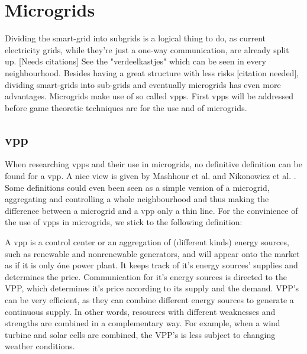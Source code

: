 \section{Microgrids }
Dividing the smart-grid into subgrids is a logical thing to do, as current electricity grids, while they're just a one-way communication, are already split up. [Needs citations] See the "verdeelkastjes" which can be seen in every neighbourhood. Besides having a great structure with less risks [citation needed], dividing smart-grids into sub-grids and eventually microgrids  has even more advantages.  Microgrids make use of so called \glspl{vpp}. First \glspl{vpp} will be addressed before game theoretic techniques are  for the use and  of microgrids. 

\subsection{\acrlong{vpp}}
When researching \glspl{vpp} and their use in microgrids, no definitive definition can be found for a \gls{vpp}. A nice view is given by Mashhour et al. \cite{MashhourMoghaddas-Tafreshi2011} and Nikonowicz et al. \cite{NikonowiczMilewski2012}. Some definitions could even been seen as a simple version of a microgrid, aggregating and controlling a whole neighbourhood \cite{Kumagai2012} and thus making the difference between a microgrid and a \gls{vpp} only a thin line. For the convinience of the use of \glspl{vpp} in microgrids, we stick to the following definition:

A \gls{vpp} is a control center or an aggregation of (different kinds) energy sources, such as renewable and nonrenewable generators, and will appear onto the market as if it is only \'one power plant. It keeps track of it's energy sources' supplies and determines the price. Communication for it's energy sources is directed to the VPP, which determines it's price according to its supply and the demand. VPP's can be very efficient, as they can combine different energy sources to generate a continuous supply. In other words, resources with different weaknesses and strengths are combined in a complementary way\cite{Koeppel2003}. For example, when a wind turbine and solar cells are combined, the VPP's is less subject to  changing weather conditions. \cite{Tromly2001}\cite{Kumagai2012}\cite{MashhourMoghaddas-Tafreshi2011}\cite{NikonowiczMilewski2012}

